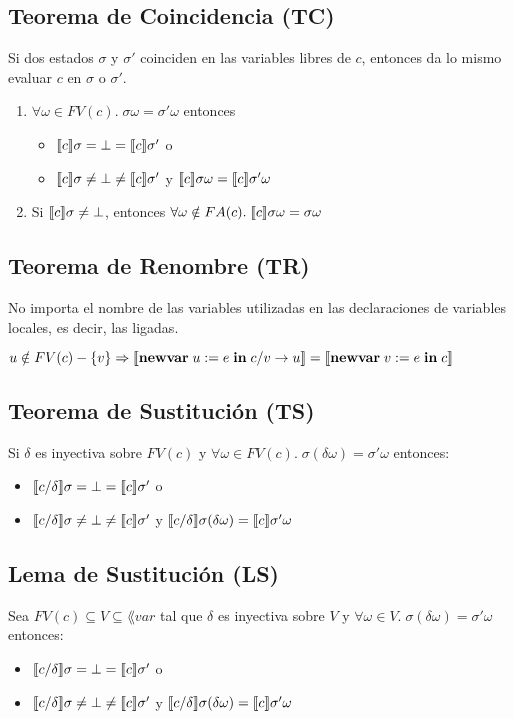   \subsection*{Teorema de Coincidencia (TC)}
    \PN Si dos estados $\sigma$ y $\sigma'$ coinciden en las variables libres de $c$, entonces da lo mismo evaluar $c$ en $\sigma$ o $\sigma'$.
    \begin{enumerate}
      \item $\forall \omega \in FV(c) . \; \sigma \omega = \sigma' \omega$ entonces
        \begin{itemize}
          \item $\llbracket c\rrbracket \sigma = \bot = \llbracket c\rrbracket \sigma'$ o
          \item $\llbracket c\rrbracket \sigma \neq \bot \neq \llbracket c\rrbracket \sigma'$ y $\llbracket c\rrbracket \sigma \omega = \llbracket c\rrbracket \sigma' \omega$
        \end{itemize}
      \item Si $\llbracket c\rrbracket \sigma \neq \bot$, entonces $\forall \omega \notin FA(c) . \; \llbracket c\rrbracket \sigma \omega = \sigma \omega$
    \end{enumerate}
  
  \subsection*{Teorema de Renombre (TR)}
    \PN No importa el nombre de las variables utilizadas en las declaraciones de variables locales, es decir, las ligadas.

    \vspace{3mm}
    \PN $u \notin FV(c) - \{v\} \Rightarrow \llbracket\textbf{newvar}\;u := e\;\textbf{in}\;c/v\rightarrow u\rrbracket = \llbracket\textbf{newvar}\;v := e\;\textbf{in}\;c\rrbracket$

  \subsection*{Teorema de Sustitución (TS)}
    \PN Si $\delta$ es inyectiva sobre $FV(c)$ y $\forall \omega \in FV(c) . \; \sigma(\delta \omega) = \sigma' \omega$ entonces:
    \begin{itemize}
      \item $\llbracket c/\delta\rrbracket \sigma = \bot = \llbracket c\rrbracket \sigma'$ o
      \item $\llbracket c/\delta\rrbracket \sigma \neq \bot \neq \llbracket c\rrbracket \sigma'$ y $\llbracket c/\delta\rrbracket \sigma (\delta \omega) = \llbracket c\rrbracket \sigma' \omega$
    \end{itemize}
    
  \subsection*{Lema de Sustitución (LS)}
    \PN Sea $FV(c) \subseteq V \subseteq \lang{var}$ tal que $\delta$ es inyectiva sobre $V$ y $\forall \omega \in V . \; \sigma(\delta \omega) = \sigma' \omega$ entonces:
    \begin{itemize}
      \item $\llbracket c/\delta\rrbracket \sigma = \bot = \llbracket c\rrbracket \sigma'$ o
      \item $\llbracket c/\delta\rrbracket \sigma \neq \bot \neq \llbracket c\rrbracket \sigma'$ y $\llbracket c/\delta\rrbracket \sigma (\delta \omega) = \llbracket c\rrbracket \sigma' \omega$
    \end{itemize}
    
